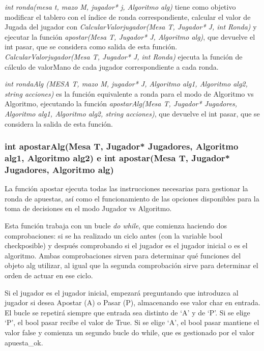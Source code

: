 \textit{int ronda(mesa t, mazo M, jugador* j, Algoritmo alg)} tiene como objetivo modificar el tablero con el índice de ronda correspondiente, calcular el valor de Jugada del jugador con \textit{CalcularValorjugador(Mesa T, Jugador* J, int Ronda)} y ejecutar la función \textit{apostar(Mesa T, Jugador* J, Algoritmo alg)}, que devuelve el int pasar, que se considera como salida de esta función. 
\textit{CalcularValorjugador(Mesa T, Jugador* J, int Ronda)} ejecuta la función de cálculo de valorMano de cada jugador correspondiente a cada ronda.

\textit{int rondaAlg (MESA T, mazo M, jugador* J, Algoritmo alg1, Algoritmo alg2, string acciones)} es la función equivalente a ronda para el modo de Algoritmo vs Algoritmo, ejecutando la función \textit{apostarAlg(Mesa T, Jugador* Jugadores, Algoritmo alg1, Algoritmo alg2, string acciones)}, que devuelve el int pasar, que se considera la salida de esta función.


\subsubsection{int apostarAlg(Mesa T, Jugador* Jugadores, Algoritmo alg1, Algoritmo alg2) e int apostar(Mesa T, Jugador* Jugadores, Algoritmo alg) }

La función apostar ejecuta todas las instrucciones necesarias para gestionar la ronda de apuestas, así como el funcionamiento de las opciones disponibles para la toma de decisiones en el modo Jugador vs Algoritmo.

Esta función trabaja con un bucle \textit{do while}, que comienza haciendo dos comprobaciones: si se ha realizado un ciclo antes (con la variable bool checkposible) y después comprobando si el jugador es el jugador inicial o es el algoritmo. Ambas comprobaciones sirven para determinar qué funciones del objeto alg utilizar, al igual que la segunda comprobación sirve para determinar el orden de actuar en ese ciclo.

 Si el jugador es el jugador inicial, empezará preguntando que introduzca al jugador si desea Apostar (A) o Pasar (P), almacenando ese valor char en entrada. El bucle se repetirá siempre que entrada sea distinto de ‘A’ y de ‘P’.
Si se elige ‘P’, el bool pasar recibe el valor de True.
Si se elige ‘A’, el bool pasar mantiene el valor false y comienza un segundo bucle do while, que es gestionado por el valor apuesta\_ok.

